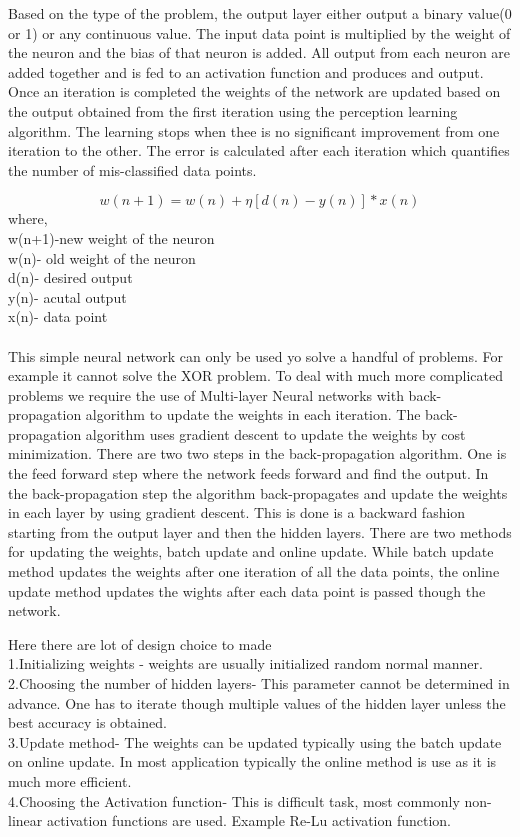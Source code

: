 \documentclass[sigconf]{acmart}
\begin{document}
Based on the type of the problem, the output layer either output a binary value(0 or 1) or any continuous value. The input data point is multiplied by the weight of the neuron and the bias of that neuron is added. All output from each neuron are added together and is fed to an activation function and produces and output. Once an iteration is completed the weights of the network are updated based on the output obtained from the first iteration using the perception learning algorithm. The learning stops when thee is no significant improvement from one iteration to the other. The error is calculated after each iteration which quantifies the number of mis-classified data points.

\begin{equation}
   w(n+1) = w(n) + \eta[d(n)-y(n)]*x(n)
\end{equation}
where,\\
w(n+1)-new weight of the neuron\\
w(n)- old weight of the neuron\\
d(n)- desired output\\
y(n)- acutal output\\
x(n)- data point\\\\

This simple neural network can only be used yo solve a handful of problems. For example it cannot solve the XOR problem. To deal with much more complicated problems we require the use of Multi-layer Neural networks with back-propagation algorithm to update the weights in each iteration. The back-propagation algorithm uses gradient descent to update the weights by cost minimization. There are two two steps in the back-propagation algorithm. One is the feed forward step where the network feeds forward and find the output. In the back-propagation step the algorithm back-propagates and update the weights in each layer by using gradient descent. This is done is a backward fashion starting from the output layer and then the hidden layers. There are two methods for updating the weights, batch update and online update. While batch update method updates the weights after one iteration of all the data points, the online update method updates the wights after each data point is passed though the network.

Here there are lot of design choice to made\\
1.Initializing weights - weights are usually initialized random normal manner. \\
2.Choosing the number of hidden layers- This parameter cannot be determined in advance. One has to iterate though multiple values of the hidden layer unless the best accuracy is obtained.\\
3.Update method- The weights can be updated typically using the batch update on online update. In most application typically the online method is use as it is much more efficient.\\
4.Choosing the Activation function- This is difficult task, most commonly non-linear activation functions are used. Example Re-Lu activation function.
\end{document}
